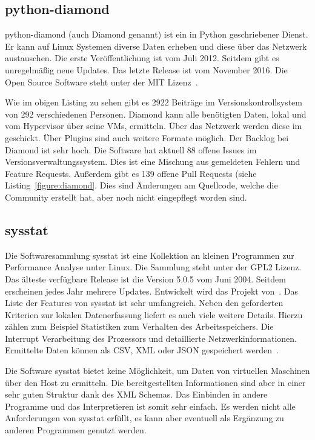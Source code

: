 \subsection{python-diamond}
python-diamond (auch Diamond genannt) ist ein in Python geschriebener Dienst.
Er kann auf Linux Systemen diverse Daten erheben und diese über das Netzwerk
austauschen. Die erste Veröffentlichung ist vom Juli 2012. Seitdem gibt es
unregelmäßig neue Updates. Das letzte Release ist vom November 2016. Die Open
Source Software steht unter der MIT Lizenz~\cite{python-diamond}.



Wie im obigen Listing zu sehen gibt es 2922 Beiträge im Versionskontrollsystem
von 292 verschiedenen Personen. Diamond kann alle benötigten Daten, lokal und
vom Hypervisor über seine VMs, ermitteln. Über das Netzwerk werden diese im
 geschickt. Über Plugins sind auch weitere
Formate möglich. Der \gls{Backlog} bei Diamond ist sehr hoch. Die Software hat
aktuell 88 offene Issues im Versionsverwaltungssystem. Dies ist eine Mischung
aus gemeldeten Fehlern und Feature Requests. Außerdem gibt es 139 offene Pull
Requests (siehe Listing~\ref{figure:diamond}. Dies sind Änderungen am
Quellcode, welche die Community erstellt hat, aber noch nicht eingepflegt
worden sind.
\tm%

\subsection{sysstat}
Die Softwaresammlung sysstat ist eine Kollektion an kleinen Programmen zur
Performance Analyse unter Linux. Die Sammlung steht unter der GPL2 Lizenz. Das
älteste verfügbare Release ist die Version 5.0.5 vom Juni 2004. Seitdem
erscheinen jedes Jahr mehrere Updates. Entwickelt wird das Projekt
von~\cite{systat_releases}. Das Liste der Features von sysstat ist sehr
umfangreich.  Neben den geforderten Kriterien zur lokalen Datenerfassung
liefert es auch viele weitere Details. Hierzu zählen zum Beispiel Statistiken
zum Verhalten des Arbeitsspeichers. Die Interrupt Verarbeitung des Prozessors
und detaillierte Netzwerkinformationen. Ermittelte Daten können als \gls{CSV},
\gls{XML} oder \gls{JSON} gespeichert werden~\cite{sysstat_features}.

Die Software sysstat bietet keine Möglichkeit, um Daten von virtuellen
Maschinen über den Host zu ermitteln. Die bereitgestellten Informationen sind
aber in einer sehr guten Struktur dank des XML Schemas. Das Einbinden in andere
Programme und das Interpretieren ist somit sehr einfach. Es werden nicht alle
Anforderungen von sysstat erfüllt, es kann aber eventuell als Ergänzung zu
anderen Programmen genutzt werden.
\tm%

